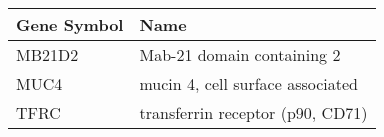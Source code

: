\begin{tabular}{ll}
\toprule
Gene Symbol &                             Name \\
\midrule
     MB21D2 &       Mab-21 domain containing 2 \\
       MUC4 & mucin 4, cell surface associated \\
       TFRC & transferrin receptor (p90, CD71) \\
\bottomrule
\end{tabular}

